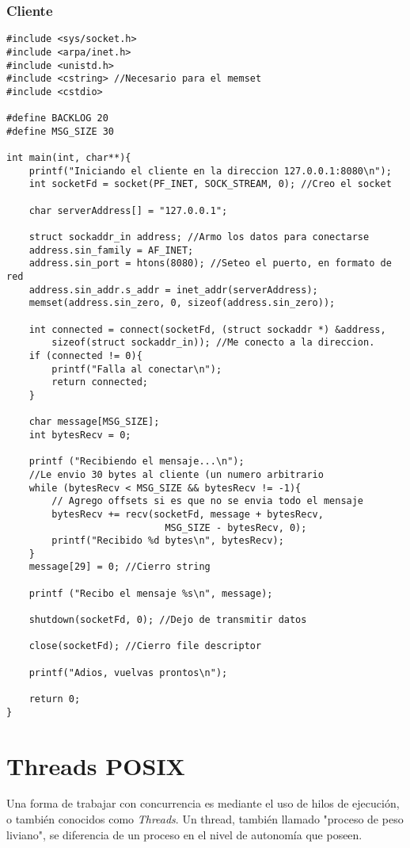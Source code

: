 \documentclass[oneside]{article}
\begin{document}
		\subsubsection{Cliente}
		\begin{lstlisting}
#include <sys/socket.h>
#include <arpa/inet.h>
#include <unistd.h>
#include <cstring> //Necesario para el memset
#include <cstdio>

#define BACKLOG 20
#define MSG_SIZE 30

int main(int, char**){
	printf("Iniciando el cliente en la direccion 127.0.0.1:8080\n");
	int socketFd = socket(PF_INET, SOCK_STREAM, 0); //Creo el socket

	char serverAddress[] = "127.0.0.1";

	struct sockaddr_in address; //Armo los datos para conectarse
	address.sin_family = AF_INET;
	address.sin_port = htons(8080); //Seteo el puerto, en formato de red
	address.sin_addr.s_addr = inet_addr(serverAddress);
	memset(address.sin_zero, 0, sizeof(address.sin_zero));

	int connected = connect(socketFd, (struct sockaddr *) &address,
		sizeof(struct sockaddr_in)); //Me conecto a la direccion.
	if (connected != 0){
		printf("Falla al conectar\n");
		return connected;
	}

	char message[MSG_SIZE];
	int bytesRecv = 0;

	printf ("Recibiendo el mensaje...\n");
	//Le envio 30 bytes al cliente (un numero arbitrario
	while (bytesRecv < MSG_SIZE && bytesRecv != -1){
		// Agrego offsets si es que no se envia todo el mensaje
		bytesRecv += recv(socketFd, message + bytesRecv,
							MSG_SIZE - bytesRecv, 0); 
		printf("Recibido %d bytes\n", bytesRecv);
	}
	message[29] = 0; //Cierro string

	printf ("Recibo el mensaje %s\n", message);

	shutdown(socketFd, 0); //Dejo de transmitir datos

	close(socketFd); //Cierro file descriptor

	printf("Adios, vuelvas prontos\n");

	return 0;
}
		\end{lstlisting}
\pagebreak
	\section{Threads POSIX}
		Una forma de trabajar con concurrencia es mediante el uso de hilos de ejecución, o también conocidos como \emph{Threads}. Un thread, también llamado "proceso de peso liviano", se diferencia de un proceso en el nivel de autonomía que poseen.
\end{document}
